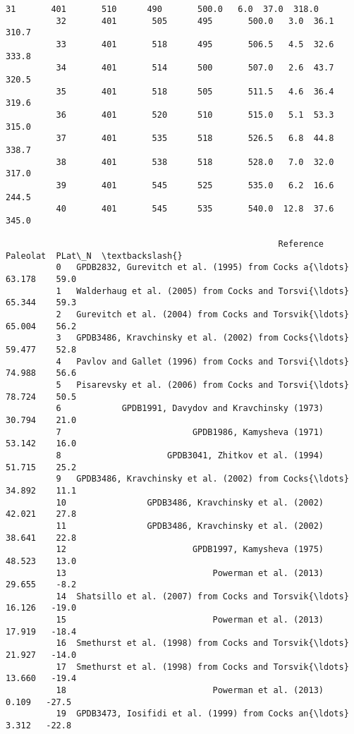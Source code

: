\documentclass[11pt]{article}
\begin{document}
\begin{Verbatim}[commandchars=\\\{\}]
          31       401       510      490       500.0   6.0  37.0  318.0   
          32       401       505      495       500.0   3.0  36.1  310.7   
          33       401       518      495       506.5   4.5  32.6  333.8   
          34       401       514      500       507.0   2.6  43.7  320.5   
          35       401       518      505       511.5   4.6  36.4  319.6   
          36       401       520      510       515.0   5.1  53.3  315.0   
          37       401       535      518       526.5   6.8  44.8  338.7   
          38       401       538      518       528.0   7.0  32.0  317.0   
          39       401       545      525       535.0   6.2  16.6  244.5   
          40       401       545      535       540.0  12.8  37.6  345.0   
          
                                                      Reference  Paleolat  PLat\_N  \textbackslash{}
          0   GPDB2832, Gurevitch et al. (1995) from Cocks a{\ldots}    63.178    59.0   
          1   Walderhaug et al. (2005) from Cocks and Torsvi{\ldots}    65.344    59.3   
          2   Gurevitch et al. (2004) from Cocks and Torsvik{\ldots}    65.004    56.2   
          3   GPDB3486, Kravchinsky et al. (2002) from Cocks{\ldots}    59.477    52.8   
          4   Pavlov and Gallet (1996) from Cocks and Torsvi{\ldots}    74.988    56.6   
          5   Pisarevsky et al. (2006) from Cocks and Torsvi{\ldots}    78.724    50.5   
          6            GPDB1991, Davydov and Kravchinsky (1973)    30.794    21.0   
          7                          GPDB1986, Kamysheva (1971)    53.142    16.0   
          8                     GPDB3041, Zhitkov et al. (1994)    51.715    25.2   
          9   GPDB3486, Kravchinsky et al. (2002) from Cocks{\ldots}    34.892    11.1   
          10                GPDB3486, Kravchinsky et al. (2002)    42.021    27.8   
          11                GPDB3486, Kravchinsky et al. (2002)    38.641    22.8   
          12                         GPDB1997, Kamysheva (1975)    48.523    13.0   
          13                             Powerman et al. (2013)    29.655    -8.2   
          14  Shatsillo et al. (2007) from Cocks and Torsvik{\ldots}    16.126   -19.0   
          15                             Powerman et al. (2013)    17.919   -18.4   
          16  Smethurst et al. (1998) from Cocks and Torsvik{\ldots}    21.927   -14.0   
          17  Smethurst et al. (1998) from Cocks and Torsvik{\ldots}    13.660   -19.4   
          18                             Powerman et al. (2013)     0.109   -27.5   
          19  GPDB3473, Iosifidi et al. (1999) from Cocks an{\ldots}     3.312   -22.8   

\end{Verbatim}
\end{document}
